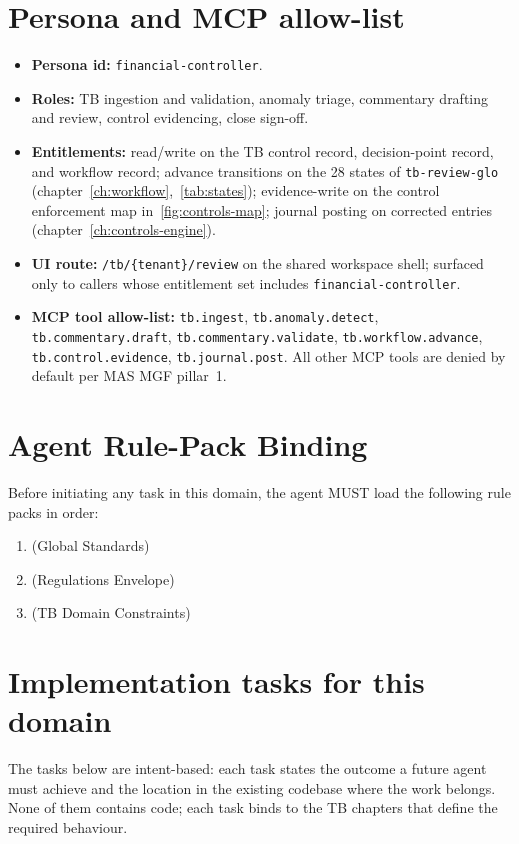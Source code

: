 \documentclass[11pt,a4paper,twoside]{report}
\begin{document}
\section{Persona and MCP allow-list}
\label{sec:agent-persona}
\begin{itemize}
\item \textbf{Persona id:} \texttt{financial-controller}.
\item \textbf{Roles:} TB ingestion and validation, anomaly triage,
commentary drafting and review, control evidencing, close
sign-off.
\item \textbf{Entitlements:} read/write on the TB control record,
decision-point record, and workflow record; advance transitions
on the 28 states of \texttt{tb-review-glo}
(chapter~\ref{ch:workflow},~\ref{tab:states}); evidence-write on
the control enforcement map in~\ref{fig:controls-map}; journal
posting on corrected entries (chapter~\ref{ch:controls-engine}).
\item \textbf{UI route:} \texttt{/tb/\{tenant\}/review} on the
shared workspace shell; surfaced only to callers whose
entitlement set includes \texttt{financial-controller}.
\item \textbf{MCP tool allow-list:}
\texttt{tb.ingest}, \texttt{tb.anomaly.detect},
\texttt{tb.commentary.draft}, \texttt{tb.commentary.validate},
\texttt{tb.workflow.advance}, \texttt{tb.control.evidence},
\texttt{tb.journal.post}. All other MCP tools are denied by
default per MAS MGF pillar~1.
\end{itemize}

\section{Agent Rule-Pack Binding}
\label{sec:agent-rule-binding}
Before initiating any task in this domain, the agent MUST load the following rule packs in order:
\begin{enumerate}
\item {} (Global Standards)
\item {} (Regulations Envelope)
\item {} (TB Domain Constraints)
\end{enumerate}

\section{Implementation tasks for this domain}
\label{sec:agent-tasks}
The tasks below are intent-based: each task states the outcome a
future agent must achieve and the location in the existing codebase
where the work belongs. None of them contains code; each task binds
to the TB chapters that define the required behaviour.
\end{document}
